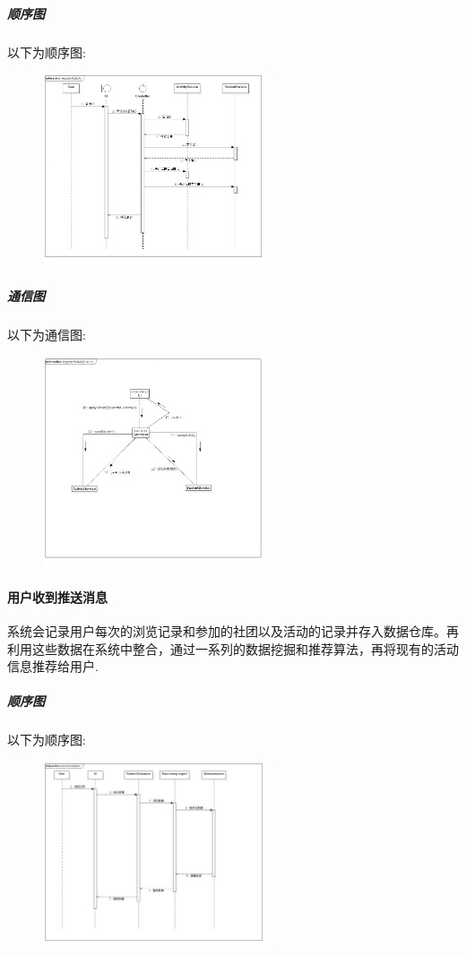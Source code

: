 \documentclass[UTF8]{ctexart}
\begin{document}
\subparagraph*{顺序图}
以下为顺序图:\\
\begin{figure}[H]
\centering
\includegraphics[width = 0.6\textwidth]{registerActivitySeq.jpg}
\end{figure}

\subparagraph*{通信图}
以下为通信图:\\
\begin{figure}[H]
\centering
\includegraphics[width = 0.6\textwidth]{registerActivityComm.jpg}
\end{figure}

\paragraph{用户收到推送消息}
系统会记录用户每次的浏览记录和参加的社团以及活动的记录并存入数据仓库。再利用这些数据在系统中整合，通过一系列的数据挖掘和推荐算法，再将现有的活动信息推荐给用户.

\subparagraph*{顺序图}
以下为顺序图:\\
\begin{figure}[H]
\centering
\includegraphics[width = 0.6\textwidth]{recommendationSeq.jpg}
\end{figure}
\end{document}
